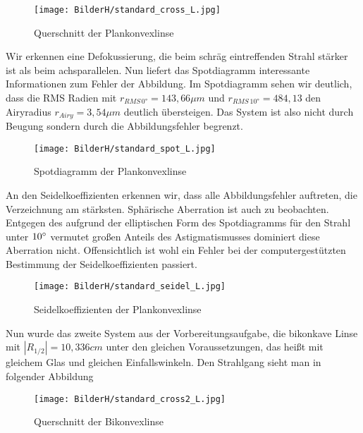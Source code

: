 \documentclass[twoside,colorback,accentcolor=tud4c,11pt]{tudreport}
\begin{document}
		
		\begin{figure}[H]
\centering
   	\begin{minipage}[b]{\textwidth}
\centering   	\texttt{[image: BilderH/standard\_cross\_L.jpg]}
   	\caption{Querschnitt der Plankonvexlinse}
  	\end{minipage}
\end{figure}
				
		
		Wir erkennen eine Defokussierung, die beim schräg eintreffenden Strahl stärker ist als beim achsparallelen.
	Nun liefert das Spotdiagramm interessante Informationen zum Fehler der Abbildung. Im Spotdiagramm sehen wir deutlich, dass die RMS Radien mit $r_{RMS \, 0°} = 143,66 \mu m $ und $r_{RMS \, 10°} = 484,13 $ den Airyradius $r_{Airy} = 3,54 \mu m$ deutlich übersteigen. Das System ist also nicht durch Beugung sondern durch die Abbildungsfehler begrenzt.
	
		\begin{figure}[H]
\centering
   	\begin{minipage}[b]{\textwidth}
\centering   	\texttt{[image: BilderH/standard\_spot\_L.jpg]}
   	\caption{Spotdiagramm der Plankonvexlinse}
  	\end{minipage}
\end{figure}
		
	An den Seidelkoeffizienten erkennen wir, dass alle Abbildungsfehler auftreten, die Verzeichnung am stärksten. Sphärische Aberration ist auch zu beobachten. Entgegen des aufgrund der elliptischen Form des Spotdiagramms für den Strahl unter $10\degree$ vermutet großen Anteils des Astigmatismusses dominiert diese Aberration nicht. Offensichtlich ist wohl ein Fehler bei der computergestützten Bestimmung der Seidelkoeffizienten passiert.
	
\begin{figure}[H]
\centering
   	\begin{minipage}[b]{\textwidth}
\centering   	\texttt{[image: BilderH/standard\_seidel\_L.jpg]}
   	\caption{Seidelkoeffizienten der Plankonvexlinse}
  	\end{minipage}
\end{figure}
	
	Nun wurde das zweite System aus der Vorbereitungsaufgabe, die bikonkave Linse mit $|R_{1/2}| = 10,336 cm$ unter den gleichen Voraussetzungen, das heißt mit gleichem Glas und gleichen Einfallswinkeln. Den Strahlgang sieht man in folgender Abbildung 
	
	\begin{figure}[H]
\centering
   	\begin{minipage}[b]{\textwidth}
\centering   	\texttt{[image: BilderH/standard\_cross2\_L.jpg]}
   	\caption{Querschnitt der Bikonvexlinse}
  	\end{minipage}
\end{figure}
	
\end{document}

